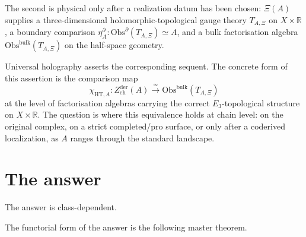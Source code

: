 The second is physical only after a realization datum has been chosen:
\(\Xi(A)\) supplies a three-dimensional holomorphic-topological
gauge theory \(T_{A,\Xi}\) on \(X \times \mathbb{R}\), a boundary
comparison
\(\eta^\partial_A\colon\mathrm{Obs}^{\partial}(T_{A,\Xi})\simeq A\),
and a bulk factorisation algebra
\(\mathrm{Obs}^{\mathrm{bulk}}(T_{A,\Xi})\) on the half-space
geometry.

Universal holography asserts the corresponding sequent. The concrete
form of this assertion is the comparison map
\[
 \chi_{\mathrm{HT},A}\colon
 Z^{\mathrm{der}}_{\mathrm{ch}}(A)
 \xrightarrow{\simeq}
 \mathrm{Obs}^{\mathrm{bulk}}(T_{A,\Xi})
\]
at the level of factorisation algebras carrying the correct
$E_{3}$-topological structure on $X \times \mathbb{R}$. The
question is where this equivalence holds at chain level: on the
original complex, on a strict completed/pro surface, or only after a
coderived localization, as $A$ ranges through the standard landscape.

\section{The answer}
\label{sec:climax-answer}

The answer is class-dependent.

The functorial form of the answer is the following master theorem.

